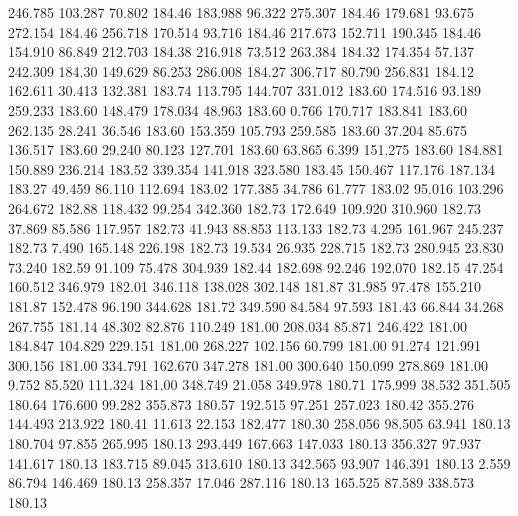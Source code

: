  246.785  103.287   70.802       184.46
 183.988   96.322  275.307       184.46
 179.681   93.675  272.154       184.46
 256.718  170.514   93.716       184.46
 217.673  152.711  190.345       184.46
 154.910   86.849  212.703       184.38
 216.918   73.512  263.384       184.32
 174.354   57.137  242.309       184.30
 149.629   86.253  286.008       184.27
 306.717   80.790  256.831       184.12
 162.611   30.413  132.381       183.74
 113.795  144.707  331.012       183.60
 174.516   93.189  259.233       183.60
 148.479  178.034   48.963       183.60
   0.766  170.717  183.841       183.60
 262.135   28.241   36.546       183.60
 153.359  105.793  259.585       183.60
  37.204   85.675  136.517       183.60
  29.240   80.123  127.701       183.60
  63.865    6.399  151.275       183.60
 184.881  150.889  236.214       183.52
 339.354  141.918  323.580       183.45
 150.467  117.176  187.134       183.27
  49.459   86.110  112.694       183.02
 177.385   34.786   61.777       183.02
  95.016  103.296  264.672       182.88
 118.432   99.254  342.360       182.73
 172.649  109.920  310.960       182.73
  37.869   85.586  117.957       182.73
  41.943   88.853  113.133       182.73
   4.295  161.967  245.237       182.73
   7.490  165.148  226.198       182.73
  19.534   26.935  228.715       182.73
 280.945   23.830   73.240       182.59
  91.109   75.478  304.939       182.44
 182.698   92.246  192.070       182.15
  47.254  160.512  346.979       182.01
 346.118  138.028  302.148       181.87
  31.985   97.478  155.210       181.87
 152.478   96.190  344.628       181.72
 349.590   84.584   97.593       181.43
  66.844   34.268  267.755       181.14
  48.302   82.876  110.249       181.00
 208.034   85.871  246.422       181.00
 184.847  104.829  229.151       181.00
 268.227  102.156   60.799       181.00
  91.274  121.991  300.156       181.00
 334.791  162.670  347.278       181.00
 300.640  150.099  278.869       181.00
   9.752   85.520  111.324       181.00
 348.749   21.058  349.978       180.71
 175.999   38.532  351.505       180.64
 176.600   99.282  355.873       180.57
 192.515   97.251  257.023       180.42
 355.276  144.493  213.922       180.41
  11.613   22.153  182.477       180.30
 258.056   98.505   63.941       180.13
 180.704   97.855  265.995       180.13
 293.449  167.663  147.033       180.13
 356.327   97.937  141.617       180.13
 183.715   89.045  313.610       180.13
 342.565   93.907  146.391       180.13
   2.559   86.794  146.469       180.13
 258.357   17.046  287.116       180.13
 165.525   87.589  338.573       180.13
